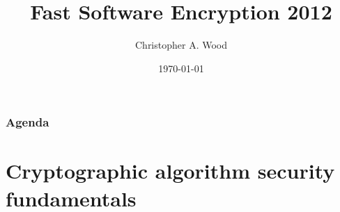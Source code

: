 \documentclass[handout]{beamer}
\title[Fast Software Encryption 2012 - Paper Review]{Fast Software Encryption 2012}
\institute[RIT]{}
\date{\today}
\author{Christopher A. Wood}
\begin{document}

\begin{frame}
	\titlepage
\end{frame}

\begin{frame}
	\frametitle{Agenda}
	\tableofcontents
\end{frame}

\section{Cryptographic algorithm security fundamentals}

\end{document}
